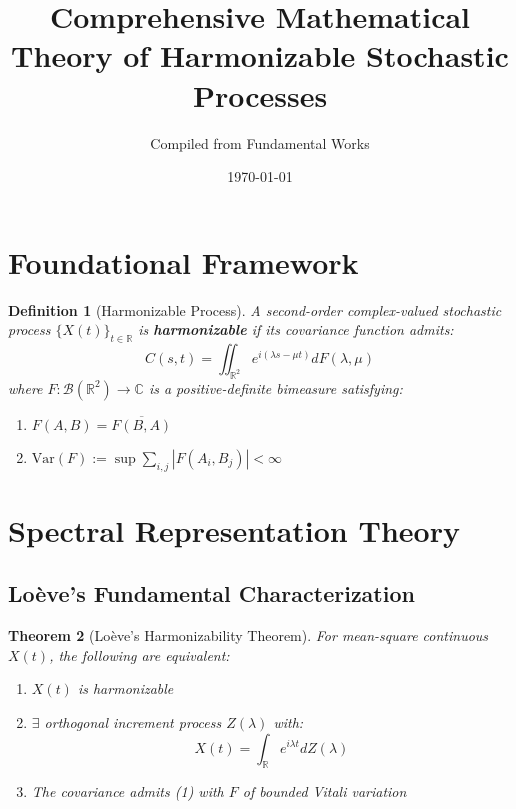 \documentclass[12pt]{article}
\title{Comprehensive Mathematical Theory of Harmonizable Stochastic Processes}
\author{Compiled from Fundamental Works}
\date{\today}
\newtheorem{theorem}{Theorem}[section]
\newtheorem{definition}[theorem]{Definition}
\begin{document}
\maketitle

\section{Foundational Framework}

\begin{definition}[Harmonizable Process]
A second-order complex-valued stochastic process $\{X(t)\}_{t \in \mathbb{R}}$ is \textbf{harmonizable} if its covariance function admits:
\begin{equation}
C(s,t) = \iint_{\mathbb{R}^2} e^{i(\lambda s - \mu t)} dF(\lambda, \mu)
\end{equation}
where $F: \mathcal{B}(\mathbb{R}^2) \to \mathbb{C}$ is a positive-definite bimeasure satisfying:
\begin{enumerate}
\item $F(A,B) = \overline{F(B,A)}$
\item $\text{Var}(F) := \sup \sum_{i,j} |F(A_i,B_j)| < \infty$
\end{enumerate}
\end{definition}

\section{Spectral Representation Theory}

\subsection{Loève's Fundamental Characterization}

\begin{theorem}[Loève's Harmonizability Theorem]
For mean-square continuous $X(t)$, the following are equivalent:
\begin{enumerate}
\item $X(t)$ is harmonizable
\item $\exists$ orthogonal increment process $Z(\lambda)$ with:
\begin{equation}
X(t) = \int_{\mathbb{R}} e^{i\lambda t} dZ(\lambda)
\end{equation}
\item The covariance admits (1) with $F$ of bounded Vitali variation
\end{enumerate}
\end{theorem}
\end{document}
